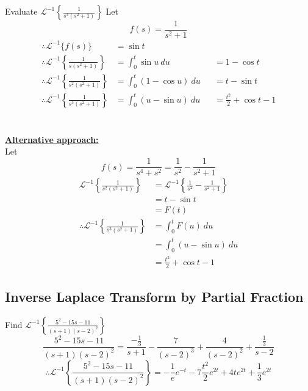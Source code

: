 \documentclass[12pt]{article}
\newcommand{\Lapinv}{\mathscr{L}^{-1}}
\begin{document}
\begin{example}{Evaluate $\displaystyle \Lapinv \left\{ \frac{1}{s^3(s^2+1)} \right\}$}{}
    Let \[
        f(s) = \frac{1}{s^2+1}
    \]
    \begin{align*}
        \therefore \Lapinv \{ f(s) \} &= \sin{t} \\
        \therefore \Lapinv \left\{ \frac{1}{s(s^2+1)} \right\} &= \int_{0}^{t} {\sin{u}} \: d{u} &&= 1-\cos{t}\\
        \therefore \Lapinv \left\{ \frac{1}{s^2(s^2+1)} \right\} &= \int_{0}^{t} {(1-\cos{u})} \: d{u} &&= t - \sin{t} \\
        \therefore \Lapinv \left\{ \frac{1}{s^3(s^2+1)} \right\} &= \int_{0}^{t} {(u-\sin{u})} \: d{u} &&= \frac{t^2}{2} + \cos{t} - 1
    \end{align*}\\~\\
    
    \underline{\textbf{Alternative approach: }}
    \\Let \[
        f(s) = \frac{1}{s^4 + s^2} = \frac{1}{s^2} - \frac{1}{s^2+1}
    \]
    \begin{align*}
        \Lapinv \left\{ \frac{1}{s^2(s^2+1)} \right\} &= \Lapinv \left\{ \frac{1}{s^2} - \frac{1}{s^2+1} \right\} \\
        &= t - \sin{t} \\
        &= F(t) \\
        \therefore \Lapinv \left\{ \frac{1}{s^3(s^2+1)} \right\} &= \int_{0}^{t} {F(u)} \: d{u} \\
        &= \int_{0}^{t} {(u-\sin{u})} \: d{u} \\
        &= \frac{t^2}{2} + \cos{t} - 1
    \end{align*}
\end{example}


\subsection{Inverse Laplace Transform by Partial Fraction}

\begin{example}{Find $\displaystyle \Lapinv \left\{ \frac{5^2 - 15s - 11}{(s+1)(s-2)^2} \right\}$}{}
    \[
        \frac{5^2 - 15s - 11}{(s+1)(s-2)^2} = \frac{-\frac{1}{3}}{s+1} - \frac{7}{(s-2)^3} + \frac{4}{(s-2)^2} + \frac{\frac{1}{3}}{s-2}
    \] \[
        \therefore \Lapinv \left\{ \frac{5^2 - 15s - 11}{(s+1)(s-2)^2} \right\} = -\frac{1}{e}e^{-t} - 7 \frac{t^2}{2} e^{2t} + 4te^{2t} + \frac{1}{3}e^{2t}
    \]
\end{example}
\end{document}
